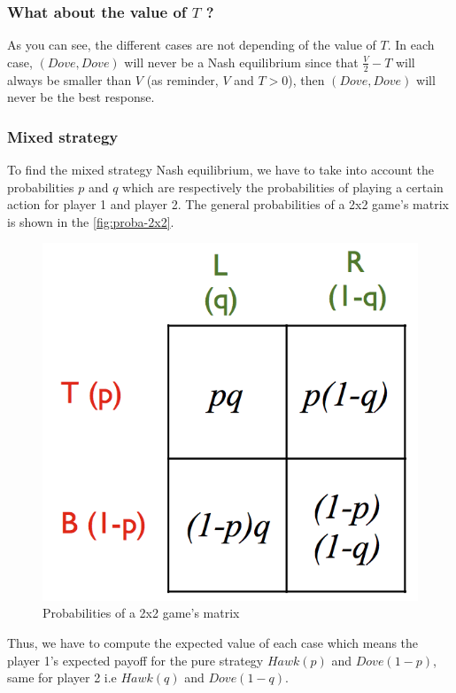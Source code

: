 \documentclass{article}
\begin{document}
\subsubsection{What about the value of $T$ ?}
As you can see, the different cases are not depending of the value of $T$. In each case, $(Dove, Dove)$ will never be a Nash equilibrium since that $\frac{V}{2}-T$ will always be smaller than $V$ (as reminder, $V$ and $T > 0$), then $(Dove,Dove)$ will never be the best response.  

\subsubsection{Mixed strategy}
To find the mixed strategy Nash equilibrium, we have to take into account the probabilities $p$ and $q$ which are respectively the probabilities of playing a certain action for player 1 and player 2. The general probabilities of a 2x2 game's matrix is shown in the \autoref{fig:proba-2x2}. 

\begin{figure}[h]
  \centering
  \includegraphics[scale=0.35]{figures/proba-2x2.png}
  \caption{Probabilities of a 2x2 game's matrix}
  \label{fig:proba-2x2}
\end{figure}

Thus, we have to compute the expected value of each case which means the player 1’s expected payoff for the pure strategy $Hawk(p)$ and $Dove(1-p)$, same for player 2 i.e $Hawk(q)$ and $Dove(1-q)$.
\end{document}
